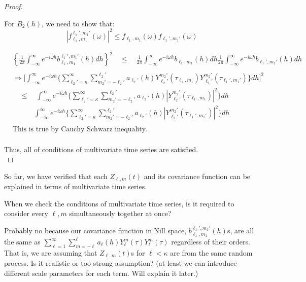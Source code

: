 \documentclass[11pt]{article}
\begin{document}
\begin{itemize}
\begin{proof}
\begin{enumerate}
For $B_2(h)$, we need to show that:\\
$$|f_{\ell_1,m_1}^{\ell_1', m_1'}(\omega)|^2 \le f_{\ell_1,m_1}(\omega) f_{\ell_1',m_1'}(\omega)$$

\begin{align*}
&\left\{ \frac{1}{2\pi} \int_{-\infty}^\infty e^{-i\omega h} b_{\ell_1,m_1}^{\ell_1',m_1'}(h) dh \right\}^2 \quad \le \quad \frac{1}{2\pi} \int_{-\infty}^\infty e^{-i\omega h} b_{\ell_1,m_1}(h) dh \frac{1}{2\pi} \int_{-\infty}^\infty e^{-i\omega h} b_{\ell_1',m_1'}(h) dh \\
\\
&\Rightarrow \biggl[ \int_{-\infty}^\infty e^{-i\omega h} \biggl\{ \sum_{\ell_2'=\kappa}^{\infty} \sum_{m_2'=-\ell_2'}^{\ell_2'} a_{\ell_2'}(h) Y_{\ell_2'}^{m_2'}(\tau_{\ell_1,m_1}) Y_{\ell_2'}^{m_2'}(\tau_{\ell_1',m_1'}) \biggl\} dh \biggl]^2\\ 
&\quad \le \quad \int_{-\infty}^\infty e^{-i\omega h} \biggl\{ \sum_{\ell_2'=\kappa}^{\infty} \sum_{m_2'=-\ell_2'}^{\ell_2'} a_{\ell_2'}(h) |Y_{\ell_2'}^{m_2'}(\tau_{\ell_1,m_1})|^2 \biggl\} dh\\
&\quad \quad \quad \int_{-\infty}^\infty e^{-i\omega h} \biggl\{ \sum_{\ell_2'=\kappa}^{\infty} \sum_{m_2'=-\ell_2'}^{\ell_2'} a_{\ell_2'}(h) |Y_{\ell_2'}^{m_2'}(\tau_{\ell_1',m_1'})|^2 \biggl\} dh\\
\\
&\text{This is true by Cauchy Schwarz inequality.}\\
\end{align*}


\end{enumerate}

Thus, all of conditions of multivariate time series are satisfied.\\

\end{proof}

\pagebreak
\item
So far, we have verified that each $Z_{\ell,m}(t)$ and its covariance function can be explained in terms of multivariate time series.\\

\item
{\color{red}
When we check the conditions of multivariate time series, is it required to consider every $\ell, m$ simultaneously together at once?\\ 

\item 
Probably no because our covariance function in Nill space, $b_{\ell_1,m_1}^{\ell_1',m_1'}(h)$s, are all the same as $\sum_{\ell=1}^{\infty} \sum_{m=-\ell}^{\ell} a_{\ell}(h) Y_{\ell}^{m}(\tau) Y_{\ell}^{m}(\tau)$ regardless of their orders. That is, we are assuming that $Z_{\ell,m}(t)$s for $\ell<\kappa$ are from the same random process. Is it realistic or too strong assumption? (at least we can introduce different scale parameters for each term. Will explain it later.) 

}
\end{itemize}
\end{document}
